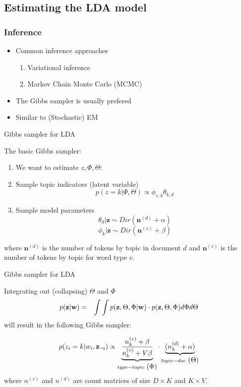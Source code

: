 \documentclass[10pt]{beamer}
\begin{document}
\subsection{Estimating the LDA model}

\begin{frame}
\frametitle{Inference}

\begin{itemize}
\item Common inference approaches

\begin{enumerate}
\item Variational inference %
\item Markov Chain Monte Carlo (MCMC) %
\end{enumerate}
\pause
\item The Gibbs sampler is usually prefered
\item Similar to (Stochastic) EM
\end{itemize}

\end{frame}



\begin{frame}{Gibbs sampler for LDA}

The basic Gibbs sampler:
\begin{enumerate}
\item We want to estimate $z, \Phi, \Theta$:
\pause
\item Sample topic indicators (latent variable)
\[
p(z=k|\Phi,\Theta)\propto\phi_{v,k}\theta_{k,d}
\]
\pause
\item Sample model parameters
\[
\theta_{d}|\mathbf{z}\sim Dir(\mathbf{n}^{(d)}+\alpha)
\]
\[
\phi_{k}|\mathbf{z}\sim Dir(\mathbf{n}^{(v)}+\beta)
\]
\end{enumerate}

where $\mathbf{n}^{(d)}$ is the number of tokens by topic in document
$d$ and $\mathbf{n}^{(v)}$ is the number of tokens by topic for word
type $v$.
\end{frame}

\begin{frame}{Gibbs sampler for LDA}

Integrating out (collapsing) $\Theta$ and $\Phi$ %
\begin{eqnarray*}
p(\mathbf{z}|\mathbf{w}) & = & \int\int p(\mathbf{z},\Theta,\Phi|\mathbf{w})\cdot p(\mathbf{z},\Theta,\Phi)d\mbox{\ensuremath{\Phi}}d\mbox{\ensuremath{\Theta}}
\end{eqnarray*}
will result in the following Gibbs sampler:

\[
p(z_{i}=k|w_{i},\mathbf{z}_{\lnot i})\propto\underbrace{\frac{n_{k}^{(v)}+\beta}{n_{k}^{(v)}+V\beta}}_{type-topic\mbox{ }\mbox{(\ensuremath{\Phi})}}\cdot\underbrace{(n_{k}^{(d)}+\alpha)}_{topic-doc\mbox{ }\mbox{(\ensuremath{\Theta})}}
\]
where $n^{(v)}$ and $n^{(d)}$ are count matrices of size $D\times K$
and $K\times V$.
\end{frame}
\end{document}
